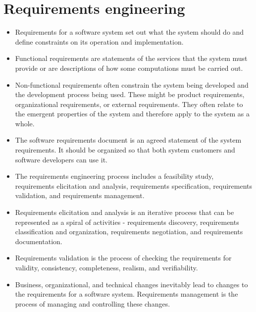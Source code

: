 \documentclass{article}
\begin{document}
\section{Requirements engineering}
\begin{itemize}
    \item Requirements for a software system set out what the system should do and define constraints on its operation and implementation.
    \item Functional requirements are statements of the services that the system must provide or are descriptions of how some computations must be carried out.
    \item Non-functional requirements often constrain the system being developed and the development process being used.
        These might be product requirements, organizational requirements, or external requirements.  They often relate to the emergent properties of the system and therefore apply to the system as a whole.
    \item The software requirements document is an agreed statement of the system requirements.  It should be organized so that both system customers and software developers can use it.
    \item The requirements engineering process includes a feasibility study, requirements elicitation and analysis, requirements specification, requirements validation, and requirements management.
    \item Requirements elicitation and analysis is an iterative process that can be represented as a spiral of activities - requirements discovery, requirements classification and organization, requirements negotiation, and requirements documentation.
    \item Requirements validation is the process of checking the requirements for validity, consistency, completeness, realism, and verifiability.
    \item Business, organizational, and technical changes inevitably lead to changes to the requirements for a software system.  Requirements management is the process of managing and controlling these changes.
\end{itemize}
\end{document}
